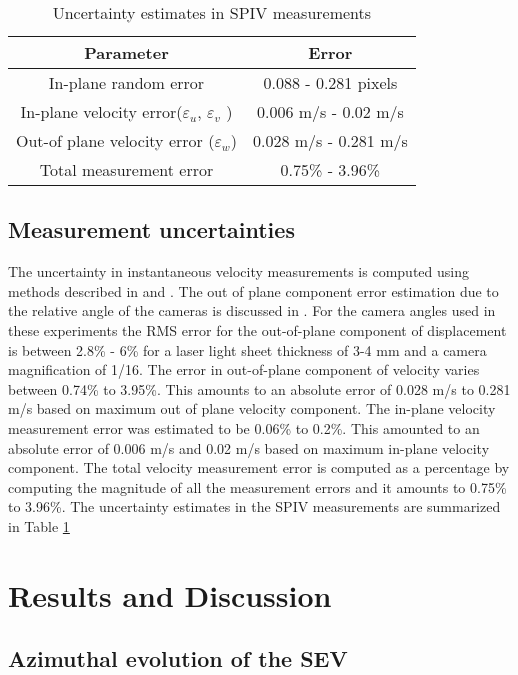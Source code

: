 \documentclass[%
 reprint,
 showkeys,
 amsmath,amssymb,
 aps,
]{revtex4-1}
\begin{document}
\begin{table}[!ht]
	\centering
	\caption{Uncertainty estimates in SPIV measurements}
	\begin{tabular}{ |c||c| }
		\hline
		Parameter  & Error\\
		\hline
		In-plane random error & 0.088 - 0.281 pixels\\
		In-plane velocity error($\varepsilon_u$, $\varepsilon_v$ )& 0.006 m/s - 0.02 m/s \\
		Out-of plane velocity error ($\varepsilon_w$) & 0.028 m/s - 0.281 m/s \\
		Total measurement error & 0.75\% - 3.96\% \\
		\hline
	\end{tabular}
	
	\label{Tab:UncertaintyEstimates}
\end{table}


\subsection{Measurement uncertainties}
The uncertainty in instantaneous velocity measurements is computed using methods described in \cite{raffel2004recording} and \cite{raffel2013particle}. The out of plane component error estimation  due to the relative angle of the cameras is discussed in \cite{lawson1997three}. For the camera angles used in these experiments the RMS error for the out-of-plane component of displacement is between 2.8\% - 6\% for a laser light sheet thickness of 3-4 mm and a camera magnification of 1/16. The error in out-of-plane component of velocity varies between 0.74\% to 3.95\%. This amounts to an absolute error of 0.028 m/s to 0.281 m/s based on maximum out of plane velocity component. The in-plane velocity measurement error was estimated to be 0.06\% to 0.2\%. This amounted to an absolute error of 0.006 m/s and 0.02 m/s based on maximum in-plane velocity component. The total velocity measurement error is computed as a percentage by computing the magnitude of all the measurement errors and it amounts to 0.75\% to 3.96\%. 
The uncertainty estimates in the SPIV measurements are summarized in Table \ref{Tab:UncertaintyEstimates}  



\section{Results and Discussion}
\subsection{Azimuthal evolution of the SEV}
\end{document}
